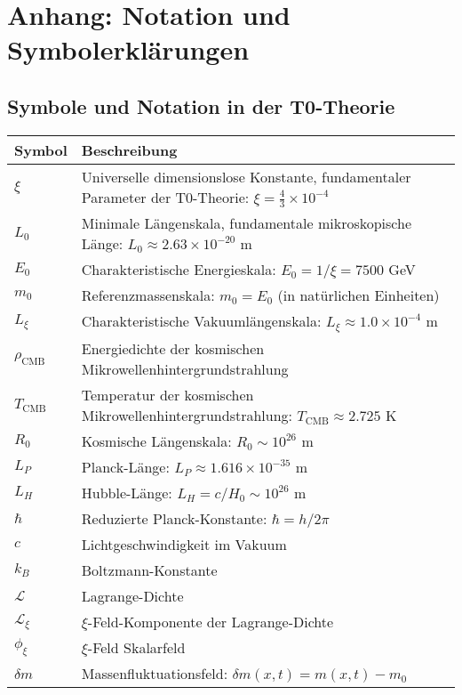 \documentclass[12pt,a4paper]{article}
\numberwithin{equation}{section}
\begin{document}
	\section*{Anhang: Notation und Symbolerklärungen}
	
	\subsection*{Symbole und Notation in der T0-Theorie}
	
	\begin{longtable}{p{2cm} p{12cm}}
		\toprule
		\textbf{Symbol} & \textbf{Beschreibung} \\
		\midrule
		\endhead
		
		$\xi$ & Universelle dimensionslose Konstante, fundamentaler Parameter der T0-Theorie: $\xi = \frac{4}{3} \times 10^{-4}$ \\
		$L_0$ & Minimale Längenskala, fundamentale mikroskopische Länge: $L_0 \approx 2.63 \times 10^{-20}$ m \\
		$E_0$ & Charakteristische Energieskala: $E_0 = 1/\xi = 7500$ GeV \\
		$m_0$ & Referenzmassenskala: $m_0 = E_0$ (in natürlichen Einheiten) \\
		$L_\xi$ & Charakteristische Vakuumlängenskala: $L_\xi \approx 1.0 \times 10^{-4}$ m \\
		$\rho_{\text{CMB}}$ & Energiedichte der kosmischen Mikrowellenhintergrundstrahlung \\
		$T_{\text{CMB}}$ & Temperatur der kosmischen Mikrowellenhintergrundstrahlung: $T_{\text{CMB}} \approx 2.725$ K \\
		$R_0$ & Kosmische Längenskala: $R_0 \sim 10^{26}$ m \\
		$L_P$ & Planck-Länge: $L_P \approx 1.616 \times 10^{-35}$ m \\
		$L_H$ & Hubble-Länge: $L_H = c/H_0 \sim 10^{26}$ m \\
		$\hbar$ & Reduzierte Planck-Konstante: $\hbar = h/2\pi$ \\
		$c$ & Lichtgeschwindigkeit im Vakuum \\
		$k_B$ & Boltzmann-Konstante \\
		$\mathcal{L}$ & Lagrange-Dichte \\
		$\mathcal{L}_{\xi}$ & $\xi$-Feld-Komponente der Lagrange-Dichte \\
		$\phi_\xi$ & $\xi$-Feld Skalarfeld \\
		$\delta m$ & Massenfluktuationsfeld: $\delta m(x,t) = m(x,t) - m_0$ \\

\end{longtable}
\end{document}

